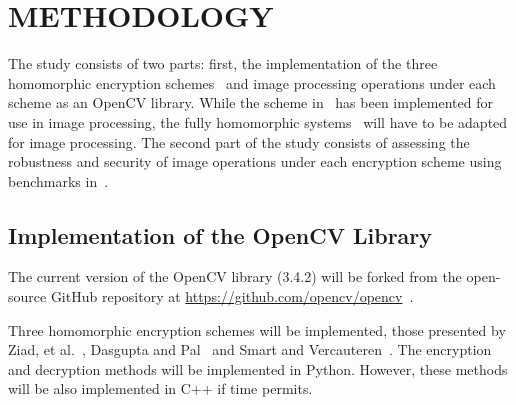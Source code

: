 \chapter{METHODOLOGY}

The study consists of two parts: first, the implementation of the three homomorphic encryption schemes~\cite{ziad_cryptoimg:_2016, dasgupta_design_2016, hutchison_fully_2010} and image processing operations under each scheme as an OpenCV library. While the scheme in~\cite{ziad_cryptoimg:_2016} has been implemented for use in image processing, the fully homomorphic systems~\cite{dasgupta_design_2016, hutchison_fully_2010} will have to be adapted for image processing. The second part of the study consists of assessing the robustness and security of image operations under each encryption scheme using benchmarks in~\cite{ahmed_benchmark_2016}.

\section{Implementation of the OpenCV Library}

The current version of the OpenCV library (3.4.2) will be forked from the open-source GitHub repository at \url{https://github.com/opencv/opencv}~\cite{bradski_opencv_2000}.

Three homomorphic encryption schemes will be implemented, those presented by Ziad, et al.~\cite{ziad_cryptoimg:_2016}, Dasgupta and Pal~\cite{dasgupta_design_2016} and Smart and Vercauteren~\cite{hutchison_fully_2010}. The encryption and decryption methods will be implemented in Python. However, these methods will be also implemented in C++ if time permits.

